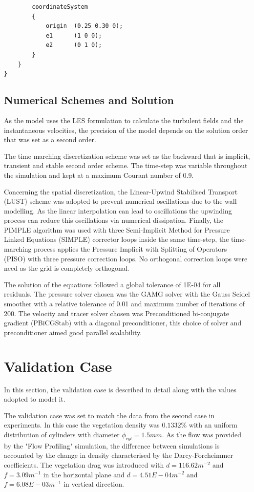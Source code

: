 \begin{refsection}
\begin{lstlisting}
        coordinateSystem
        {
            origin  (0.25 0.30 0);
            e1      (1 0 0);
            e2      (0 1 0);
        }
    }
}
\end{lstlisting}

\subsection{Numerical Schemes and Solution}
As the model uses the LES formulation to calculate the turbulent fields and the instantaneous velocities, the precision of the model depends on the solution order that was set as a second order.

The time marching discretization scheme was set as the backward that is implicit, transient and stable second order scheme. The time-step was variable throughout the simulation and kept at a maximum Courant number of 0.9.

Concerning the spatial discretization, the Linear-Upwind Stabilised Transport (LUST) scheme was adopted to prevent numerical oscillations due to the wall modelling. As the linear interpolation can lead to oscillations the upwinding process can reduce this oscillations via numerical dissipation. Finally, the PIMPLE algorithm was used with three Semi-Implicit Method for Pressure Linked Equations (SIMPLE) corrector loops inside the same time-step, the time-marching process applies the Pressure Implicit with Splitting of Operators (PISO) with three pressure correction loops. No orthogonal correction loops were need as the grid is completely orthogonal.

The solution of the equations followed a global tolerance of 1E-04 for all residuals. The pressure solver chosen was the GAMG solver with the Gauss Seidel smoother with a relative tolerance of 0.01 and maximum number of iterations of 200. The velocity and tracer solver chosen was Preconditioned bi-conjugate gradient (PBiCGStab)  with a diagonal preconditioner, this choice of solver and preconditioner aimed good parallel scalability.

\section{Validation Case}
In this section, the validation case is described in detail along with the values adopted to model it.

The validation case was set to match the data from the second case in \textcite{xiang2019} experiments. In this case the vegetation density was $0.1332\%$ with an uniform distribution of cylinders with diameter $\phi_{cyl}=1.5 mm$. As the flow was provided by the "Flow Profiling" simulation, the difference between simulations is accounted by the change in density characterised by the Darcy-Forcheimmer coefficients. The vegetation drag was introduced with $d=116.62m^{-2}$ and $f=3.09 m^{-1}$ in the horizontal plane and $d=4.51E-04 m^{-2}$ and $f=6.08E-03 m^{-1}$ in vertical direction.


\end{refsection}
